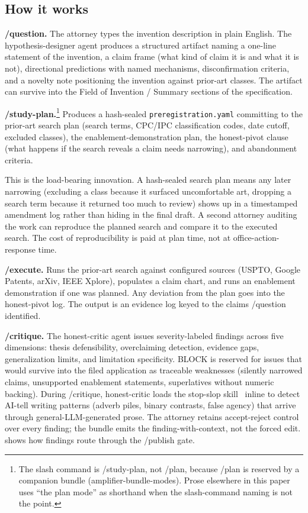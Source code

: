 \documentclass[11pt,letterpaper]{article}
\begin{document}
\subsection{How it works}

\textbf{/question.} The attorney types the invention description in
plain English. The hypothesis-designer agent produces a structured
artifact naming a one-line statement of the invention, a claim frame
(what kind of claim it is and what it is not), directional
predictions with named mechanisms, disconfirmation criteria, and a
novelty note positioning the invention against prior-art classes.
The artifact can survive into the Field of Invention / Summary
sections of the specification.

\textbf{/study-plan.}\footnote{The slash command is /study-plan, not
/plan, because /plan is reserved by a companion bundle
(amplifier-bundle-modes). Prose elsewhere in this paper uses
``the plan mode'' as shorthand when the slash-command naming is not
the point.} Produces a hash-sealed \texttt{preregistration.yaml}
committing to the prior-art search plan (search terms, CPC/IPC
classification codes, date cutoff, excluded classes), the
enablement-demonstration plan, the honest-pivot clause (what happens
if the search reveals a claim needs narrowing), and abandonment
criteria.

This is the load-bearing innovation. A hash-sealed search plan means
any later narrowing (excluding a class because it surfaced
uncomfortable art, dropping a search term because it returned too
much to review) shows up in a timestamped amendment log rather than
hiding in the final draft. A second attorney auditing the work can
reproduce the planned search and compare it to the executed search.
The cost of reproducibility is paid at plan time, not at
office-action-response time.

\textbf{/execute.} Runs the prior-art search against configured
sources (USPTO, Google Patents, arXiv, IEEE Xplore), populates a
claim chart, and runs an enablement demonstration if one was planned.
Any deviation from the plan goes into the honest-pivot log. The
output is an evidence log keyed to the claims /question identified.

\textbf{/critique.} The honest-critic agent issues severity-labeled
findings across five dimensions: thesis defensibility, overclaiming
detection, evidence gaps, generalization limits, and limitation
specificity. BLOCK is reserved for issues that would survive into the
filed application as traceable weaknesses (silently narrowed claims,
unsupported enablement statements, superlatives without numeric
backing). During /critique, honest-critic loads the stop-slop
skill~\citep{pandya2024stopslop} inline to detect AI-tell writing
patterns (adverb piles, binary contrasts, false agency) that arrive
through general-LLM-generated prose. The attorney retains
accept-reject control over every finding; the bundle emits the
finding-with-context, not the forced edit. 
shows how findings route through the /publish gate.
\end{document}
